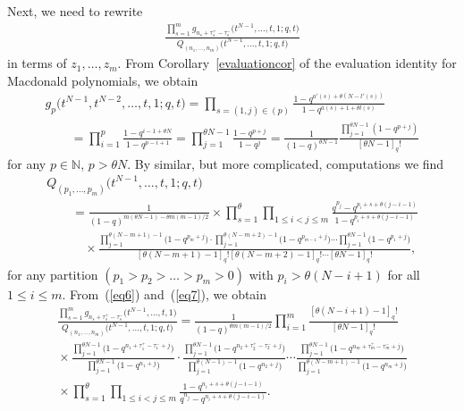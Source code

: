 \documentclass[pdftex]{sigma}
\numberwithin{equation}{section}
\newcommand{\N}{\mathbb{N}}
\begin{document}
Next, we need to rewrite
\begin{gather*}
\frac{\prod\limits_{s=1}^m{g_{n_s + \tau_s^+ - \tau_s^-}\big(t^{N-1}, \dots, t, 1; q, t\big)}}{Q_{(n_1, \dots, n_m)}\big(t^{N-1}, \dots, t, 1; q, t\big)}
 \end{gather*} in terms of $z_1, \dots, z_m$. From Corollary~\ref{evaluationcor} of the evaluation identity for Macdonald polynomials, we obtain
\begin{gather}
g_p\big(t^{N-1}, t^{N-2}, \dots, t, 1; q, t\big) = \prod_{s = (1, j)\in (p)}{\frac{1 - q^{a'(s) + \theta(N - l'(s))}}{1 - q^{a(s)+1 + \theta l(s)}}}\nonumber\\
\qquad {} = \prod_{i=1}^p{ \frac{1 - q^{i - 1 + \theta N}}{1 - q^{p - i + 1}} } = \prod_{j=1}^{\theta N - 1}{\frac{1 - q^{p+j}}{1 - q^j}} = \frac{1}{(1 - q)^{\theta N - 1}}\frac{\prod\limits_{j=1}^{\theta N - 1}{(1 - q^{p+ j})}}{[\theta N - 1]_q!}\label{eq6}
\end{gather}
for any $p\in\N$, $p > \theta N$. By similar, but more complicated, computations we f\/ind
\begin{gather}
Q_{(p_1, \dots, p_m)}\big(t^{N-1}, \dots, t, 1; q, t\big) \nonumber\\
\qquad {}= \frac{1}{(1 - q)^{m(\theta N - 1) - \theta m(m-1)/2}}\times\prod_{s=1}^{\theta}{ \prod_{1\leq i < j\leq m}{ \frac{q^{p_j} - q^{p_i + s + \theta(j - i - 1)}}{1 - q^{p_i + s + \theta (j - i - 1)}} } }\nonumber\\
\qquad\quad {} \times\frac{\prod\limits_{j=1}^{\theta(N-m+1)-1}{\big(1 - q^{p_m + j}\big)}\cdot \prod\limits_{j=1}^{\theta(N-m+2)-1}{\big(1 - q^{p_{m-1} + j}\big)}\cdots\prod\limits_{j=1}^{\theta N-1}{\big(1 - q^{p_1 + j}\big)}}{[\theta(N-m+1)-1]_q![\theta(N-m+2)-1]_q!\cdots [\theta N - 1]_q!},\label{eq7}
\end{gather}
for any partition $(p_1 > p_2 > \dots > p_m > 0)$ with $p_i > \theta (N - i + 1)$ for all $1\leq i\leq m$. From~(\ref{eq6}) and~(\ref{eq7}), we obtain
\begin{gather}
\frac{\prod\limits_{s=1}^m{g_{n_s + \tau_s^+ - \tau_s^-}\big(t^{N-1}, \dots, t, 1\big)}}{Q_{(n_1, \dots, n_m)}\big(t^{N-1}, \dots, t, 1; q, t\big)} = \frac{1}{(1 - q)^{\theta m(m-1)/2}}\prod_{i=1}^m{\frac{[\theta(N-i+1)-1]_q!}{[\theta N - 1]_q!}} \label{eq77}\\
{} {}\times \frac{\prod\limits_{j=1}^{\theta N - 1}{\big(1 - q^{n_1 + \tau_1^+ - \tau_1^- + j}\big)}}{\prod\limits_{j=1}^{\theta N - 1}{\big(1 - q^{n_1 + j}\big)}} \cdot \frac{\prod\limits_{j=1}^{\theta N - 1}{\big(1 - q^{n_2 + \tau_2^+ - \tau_2^- + j}\big)}}{\prod\limits_{j=1}^{\theta (N-1) - 1}{\big(1 - q^{n_2 + j}\big)}}\cdots \frac{\prod\limits_{j=1}^{\theta N - 1}{\big(1 - q^{n_m + \tau_m^+ - \tau_m^- + j}\big)}}{\prod\limits_{j=1}^{\theta (N-m+1) - 1}{\big(1 - q^{n_m + j}\big)}} \label{eq8}\\
{} \times \prod_{s=1}^{\theta}{ \prod_{1\leq i < j\leq m}{ \frac{1 - q^{n_i + s + \theta(j - i - 1)}}{q^{n_j} - q^{n_i + s + \theta(j - i - 1)}} } }.\label{eq9}
\end{gather}
\end{document}
